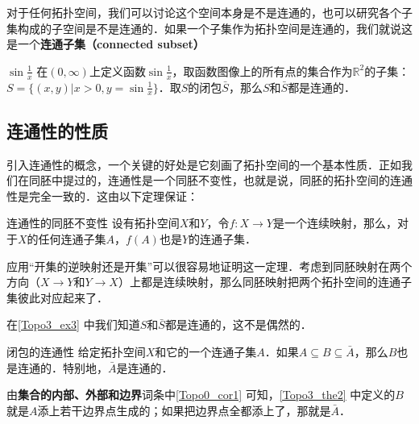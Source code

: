 对于任何拓扑空间，我们可以讨论这个空间本身是不是连通的，也可以研究各个子集构成的子空间是不是连通的．如果一个子集作为拓扑空间是连通的，我们就说这是一个\textbf{连通子集（connected subset）}

\begin{example}{$\sin{\frac{1}{x}}$}\label{Topo3_ex3}
在$(0,\infty)$上定义函数$\sin{\frac{1}{x}}$，取函数图像上的所有点的集合作为$\mathbb{R}^2$的子集：$S=\{(x, y)|x>0, y=\sin{\frac{1}{x}}\}$．取$S$的闭包$\bar{S}$，那么$S$和$\bar{S}$都是连通的．
\end{example}

\subsection{连通性的性质}

引入连通性的概念，一个关键的好处是它刻画了拓扑空间的一个基本性质．正如我们在同胚中提过的，连通性是一个同胚不变性，也就是说，同胚的拓扑空间的连通性是完全一致的．这由以下定理保证：

\begin{theorem}{连通性的同胚不变性}\label{Topo3_the1}
设有拓扑空间$X$和$Y$，令$f:X\rightarrow Y$是一个连续映射，那么，对于$X$的任何连通子集$A$，$f(A)$也是$Y$的连通子集．
\end{theorem}

应用“开集的逆映射还是开集”可以很容易地证明这一定理．考虑到同胚映射在两个方向（$X\rightarrow Y$和$Y\rightarrow X$）上都是连续映射，那么同胚映射把两个拓扑空间的连通子集彼此对应起来了．

在\autoref{Topo3_ex3} 中我们知道$S$和$\bar{S}$都是连通的，这不是偶然的．

\begin{theorem}{闭包的连通性}\label{Topo3_the2}
给定拓扑空间$X$和它的一个连通子集$A$．如果$A\subseteq B\subseteq\bar{A}$，那么$B$也是连通的．特别地，$\bar{A}$是连通的．
\end{theorem}

由\textbf{集合的内部、外部和边界}词条中\autoref{Topo0_cor1} 可知，\autoref{Topo3_the2} 中定义的$B$就是$A$添上若干边界点生成的；如果把边界点全都添上了，那就是$\bar{A}$．